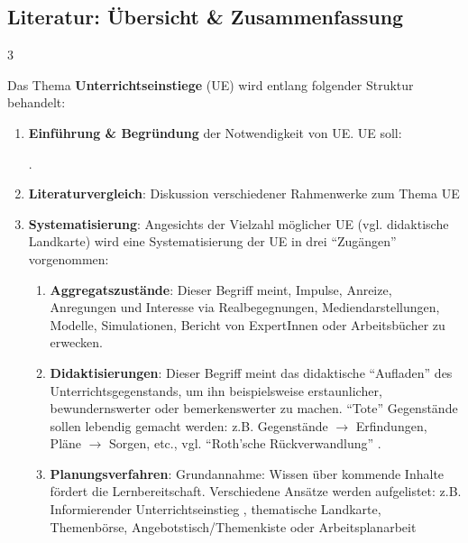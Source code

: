 \thispagestyle{empty}
\begin{landscape}
\begin{center}
\section*{Literatur: Übersicht \& Zusammenfassung}
\end{center}
\footnotesize
\begin{multicols*}{3}
\begin{myBox}[title=``Unterrichtsplanung und Methoden'' \cite{kaiser}]
Das Thema \textbf{Unterrichtseinstiege} (UE) wird entlang folgender Struktur behandelt:
\begin{enumerate}
\item \textbf{Einführung \& Begründung} der Notwendigkeit von UE. UE soll:
.
\item \textbf{Literaturvergleich}: Diskussion verschiedener Rahmenwerke zum Thema UE 
\item \textbf{Systematisierung}: Angesichts der Vielzahl möglicher UE (vgl. didaktische Landkarte) wird eine Systematisierung der UE in drei ``Zugängen'' vorgenommen:
\begin{enumerate}
\item \textbf{Aggregatszustände}: Dieser Begriff meint, Impulse, Anreize, Anregungen und Interesse via Realbegegnungen, Mediendarstellungen, Modelle, Simulationen, Bericht von ExpertInnen oder Arbeitsbücher zu erwecken.
\item \textbf{Didaktisierungen}: Dieser Begriff meint das didaktische ``Aufladen'' des Unterrichtsgegenstands, um ihn beispielsweise erstaunlicher, bewundernswerter oder bemerkenswerter zu machen. ``Tote'' Gegenstände sollen lebendig gemacht werden: z.B. Gegenstände $\rightarrow$ Erfindungen, Pläne $\rightarrow$ Sorgen, etc., vgl.  ``Roth'sche Rückverwandlung'' \cite{roth}.
\item \textbf{Planungsverfahren}: Grundannahme: Wissen über kommende Inhalte fördert die Lernbereitschaft. Verschiedene Ansätze werden aufgelistet: z.B. Informierender Unterrichtseinstieg \cite{grell}, thematische Landkarte, Themenbörse, Angebotstisch/Themenkiste oder Arbeitsplanarbeit

\end{enumerate}
\end{enumerate}
\end{myBox}
\end{multicols*}
\end{landscape}
